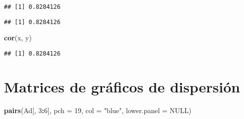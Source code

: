 \documentclass[
]{book}
\newenvironment{Shaded}{\begin{snugshade}}{\end{snugshade}}
\newcommand{\DataTypeTok}[1]{\textcolor[rgb]{0.13,0.29,0.53}{#1}}
\newcommand{\DecValTok}[1]{\textcolor[rgb]{0.00,0.00,0.81}{#1}}
\newcommand{\KeywordTok}[1]{\textcolor[rgb]{0.13,0.29,0.53}{\textbf{#1}}}
\newcommand{\NormalTok}[1]{#1}
\newcommand{\OperatorTok}[1]{\textcolor[rgb]{0.81,0.36,0.00}{\textbf{#1}}}
\newcommand{\OtherTok}[1]{\textcolor[rgb]{0.56,0.35,0.01}{#1}}
\newcommand{\StringTok}[1]{\textcolor[rgb]{0.31,0.60,0.02}{#1}}
\begin{document}
\begin{Shaded}
\end{Shaded}

\begin{verbatim}
## [1] 0.8284126
\end{verbatim}

\begin{Shaded}
\end{Shaded}

\begin{verbatim}
## [1] 0.8284126
\end{verbatim}

\begin{Shaded}
\begin{Highlighting}[]
\KeywordTok{cor}\NormalTok{(x, y)}
\end{Highlighting}
\end{Shaded}

\begin{verbatim}
## [1] 0.8284126
\end{verbatim}

\hypertarget{matrices-de-gruxe1ficos-de-dispersiuxf3n}{%
\section{Matrices de gráficos de dispersión}\label{matrices-de-gruxe1ficos-de-dispersiuxf3n}}

\begin{Shaded}
\begin{Highlighting}[]
\KeywordTok{pairs}\NormalTok{(Ad[, }\DecValTok{3}\OperatorTok{:}\DecValTok{6}\NormalTok{], }\DataTypeTok{pch =} \DecValTok{19}\NormalTok{, }\DataTypeTok{col =} \StringTok{"blue"}\NormalTok{, }\DataTypeTok{lower.panel =} \OtherTok{NULL}\NormalTok{)}
\end{Highlighting}
\end{Shaded}
\end{document}
